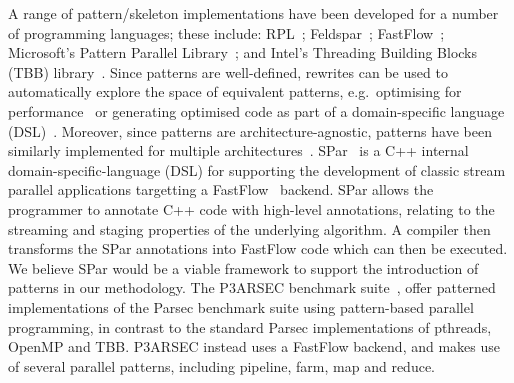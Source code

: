 A range of pattern/skeleton implementations have been developed for a number of programming languages; these include: RPL~\cite{DBLP:conf/pdp/JanjicBMHDAG16}; Feldspar~\cite{DBLP:conf/ifl/AxelssonCSSEP10}; FastFlow~\cite{doi:10.1002/9781119332015.ch13}; Microsoft's Pattern Parallel Library~\cite{ACM:book/msoft/CampbellM11}; and Intel's Threading Building Blocks (TBB) library~\cite{DBLP:reference/parallel/X11pz}.
Since patterns are well-defined, rewrites can be used to automatically explore the space of equivalent patterns, e.g.\ optimising for performance~\cite{DBLP:conf/europar/MatsuzakiKIHA04,DBLP:conf/ipps/GorlatchWL99} or generating optimised code as part of a domain-specific language (DSL)~\cite{DBLP:conf/dagstuhl/Gorlatch03}. Moreover, since patterns are architecture-agnostic, patterns have been similarly implemented for multiple architectures~\cite{DBLP:conf/cgo/HagedornSSGD18,DBLP:conf/parco/ReyesL15}.
SPar~\cite{DBLP:journals/ppl/GrieblerDTF17} is a C++ internal domain-specific-language (DSL) for supporting the development of classic stream parallel applications targetting a FastFlow~\cite{doi:10.1002/9781119332015.ch13} backend. SPar allows the programmer to annotate C++ code with high-level annotations, relating to the streaming and staging properties of the underlying algorithm. A compiler then transforms the SPar annotations into FastFlow code which can then be executed. We believe SPar would be a viable framework to support the introduction of patterns in our methodology. The P3ARSEC benchmark suite~\cite{10.1145/3132710}, offer patterned implementations of the Parsec benchmark suite using pattern-based parallel programming, in contrast to the standard Parsec implementations of pthreads, OpenMP and TBB. P3ARSEC  instead uses a FastFlow backend, and makes use of several parallel patterns, including pipeline, farm, map and reduce. %

